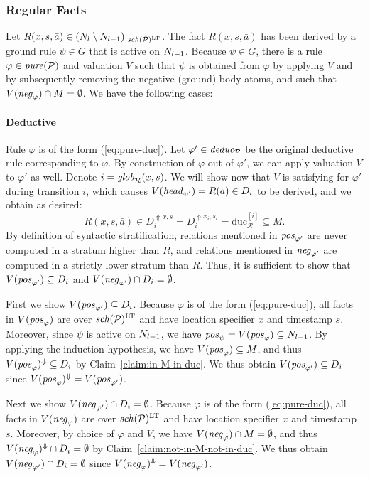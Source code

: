 \documentclass{tlp}
\newcommand{\ded}{\mathcal{P}}
\newcommand{\proj}[2]{#1|_{#2}}
\newcommand{\rl}{\varphi}
\newcommand{\head}[1]{\fname{head}_{#1}}
\newcommand{\bpos}[1]{\fname{pos}_{#1}}
\newcommand{\bneg}[1]{\fname{neg}_{#1}}
\newcommand{\schof}[1]{\fname{sch}(#1)}
\newcommand{\grl}{\psi}
\newcommand{\toloct}[1]{#1^{\mathrm{LT}}}
\newcommand{\addlt}[3]{#1^{\Uparrow#2,#3}}
\newcommand{\droplt}[1]{#1^{\Downarrow}}
\newcommand{\pure}[1]{\fname{pure}(#1)}
\newcommand{\run}{\mathcal{R}}
\newcommand{\deduc}[1]{\fname{deduc}_{#1}}
\newcommand{\globR}[1]{\fname{glob}_{\run}(#1)}
\newcommand{\sliceduc}[1]{\text{duc}_{\run}^{[#1]}}
\newcommand{\grded}{G}
\begin{document}
\begin{appendix}
\subsubsection{Regular Facts}

Let $R(x,s,\bar{a})\in\proj{(\diffN)}{\toloct{\schof{\ded}}}$. The
fact $R(x,s,\bar{a})$ has been derived by a ground rule $\grl\in\grded$
that is active on $N_{l-1}$. Because $\grl\in\grded$, there is a
rule $\rl\in\pure{\ded}$ and valuation $V$ such that $\grl$ is
obtained from $\rl$ by applying $V$ and by subsequently removing
the negative (ground) body atoms, and such that $V(\bneg{\rl})\cap M=\emptyset$.
We have the following cases:


\paragraph*{Deductive}

Rule $\rl$ is of the form (\ref{eq:pure-duc}). Let $\rl'\in\deduc{\ded}$
be the original deductive rule corresponding to $\rl$. By construction
of $\rl$ out of $\rl'$, we can apply valuation $V$ to $\rl'$ as
well. Denote $i=\globR{x,s}$. We will show now that $V$ is satisfying
for $\rl'$ during transition $i$, which causes $V(\head{\rl'})=R(\bar{a})\in D_{i}$
to be derived, and we obtain as desired: 
\[
R(x,s,\bar{a})\in\addlt{D_{i}}xs=\addlt{D_{i}}{x_{i}}{s_{i}}=\sliceduc i\subseteq M.
\]
By definition of syntactic stratification, relations mentioned in
$\bpos{\rl'}$ are never computed in a stratum higher than $R$, and
relations mentioned in $\bneg{\rl'}$ are computed in a strictly lower
stratum than $R$. Thus, it is sufficient to show that $V(\bpos{\rl'})\subseteq D_{i}$
and $V(\bneg{\rl'})\cap D_{i}=\emptyset$. 

First we show $V(\bpos{\rl'})\subseteq D_{i}$. Because $\rl$ is
of the form (\ref{eq:pure-duc}), all facts in $V(\bpos{\rl})$ are
over $\toloct{\schof{\ded}}$ and have location specifier $x$ and
timestamp $s$. Moreover, since $\grl$ is active on $N_{l-1}$, we
have $\bpos{\grl}=V(\bpos{\rl})\subseteq\prevN$. By applying the
induction hypothesis, we have $V(\bpos{\rl})\subseteq M$, and thus
$\droplt{V(\bpos{\rl})}\subseteq D_{i}$ by Claim~\ref{claim:in-M-in-duc}.
We thus obtain $V(\bpos{\rl'})\subseteq D_{i}$ since $\droplt{V(\bpos{\rl})}=V(\bpos{\rl'})$.

Next we show $V(\bneg{\rl'})\cap D_{i}=\emptyset$. Because $\rl$
is of the form (\ref{eq:pure-duc}), all facts in $V(\bneg{\rl})$
are over $\toloct{\schof{\ded}}$ and have location specifier $x$
and timestamp $s$. Moreover, by choice of $\rl$ and $V$, we have
$V(\bneg{\rl})\cap M=\emptyset$, and thus $\droplt{V(\bneg{\rl})}\cap D_{i}=\emptyset$
by Claim~\ref{claim:not-in-M-not-in-duc}. We thus obtain $V(\bneg{\rl'})\cap D_{i}=\emptyset$
since $\droplt{V(\bneg{\rl})}=V(\bneg{\rl'})$.





\end{appendix}
\end{document}
